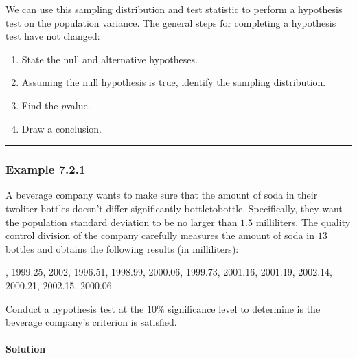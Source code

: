 \documentclass[letterpaper,10pt,english]{jupyterBook}
\begin{document}
\sphinxAtStartPar
We can use this sampling distribution and test statistic to perform a hypothesis test on the population variance. The general steps for completing a hypothesis test have not changed:
\begin{enumerate}
%
\item {} 
\sphinxAtStartPar
State the null and alternative hypotheses.

\item {} 
\sphinxAtStartPar
Assuming the null hypothesis is true, identify the sampling distribution.

\item {} 
\sphinxAtStartPar
Find the \(p\)\sphinxhyphen{}value.

\item {} 
\sphinxAtStartPar
Draw a conclusion.

\end{enumerate}


\bigskip\hrule\bigskip



\subsubsection{Example 7.2.1}
\label{\detokenize{Ch7 The Chi-Square Distribution/7.2 Hypothesis Testing for the Population Variance:example-7-2-1}}
\sphinxAtStartPar
A beverage company wants to make sure that the amount of soda in their two\sphinxhyphen{}liter bottles doesn’t differ significantly bottle\sphinxhyphen{}to\sphinxhyphen{}bottle. Specifically, they want the population standard deviation to be no larger than \(1.5\) milliliters. The quality control division of the company carefully measures the amount of soda in \(13\) bottles and obtains the following results (in milliliters):

, 1999.25, 2002, 1996.51, 1998.99, 2000.06, 1999.73, 2001.16, 2001.19, 2002.14, 2000.21, 2002.15, 2000.06

\sphinxAtStartPar
Conduct a hypothesis test at the \(10\%\) significance level to determine is the beverage company’s criterion is satisfied.


\paragraph{Solution}
\label{\detokenize{Ch7 The Chi-Square Distribution/7.2 Hypothesis Testing for the Population Variance:solution}}
\end{document}
